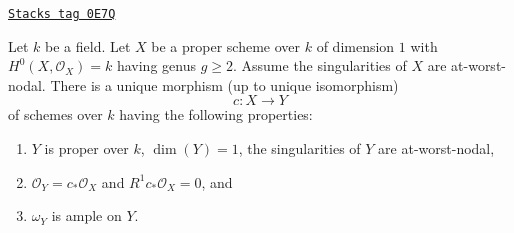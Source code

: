 \begin{lemma}
\label{curves-lemma-characterize-contraction-to-stable}
\href{https://stacks.math.columbia.edu/tag/0E7Q}{\texttt{Stacks tag 0E7Q}}

Let $k$ be a field. Let $X$ be a proper scheme over $k$ of dimension
$1$ with $H^0(X, \mathcal{O}_X) = k$ having genus $g \geq 2$.
Assume the singularities of $X$ are at-worst-nodal.
There is a unique morphism (up to unique isomorphism)
$$
c : X \longrightarrow Y
$$
of schemes over $k$ having the following properties:
\begin{enumerate}
\item $Y$ is proper over $k$, $\dim(Y) = 1$, the singularities of $Y$
are at-worst-nodal,
\item $\mathcal{O}_Y = c_*\mathcal{O}_X$ and $R^1c_*\mathcal{O}_X = 0$, and
\item $\omega_Y$ is ample on $Y$.
\end{enumerate}
\end{lemma}

